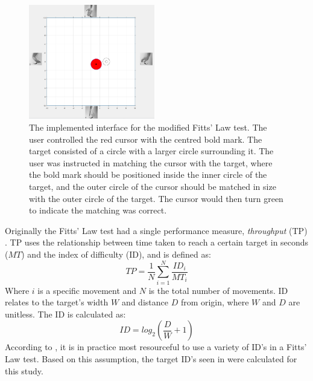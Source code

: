 \begin{figure}[H] 
	\includegraphics[width=0.49\textwidth]{figures/Paper/perftestGUI}
	\caption{The implemented interface for the modified Fitts' Law test. The user controlled the red cursor with the centred bold mark. The target consisted of a circle with a larger circle surrounding it. The user was instructed in matching the cursor with the target, where the bold mark should be positioned inside the inner circle of the target, and the outer circle of the cursor should be matched in size with the outer circle of the target. The cursor would then turn green to indicate the matching was correct.}
	\label{fig:fittsLawTask}
\end{figure}
\vspace{-0.2cm}
Originally the Fitts' Law test had a single performance measure, \textit{throughput} (TP) \cite{Fitts1954}. TP uses the relationship between time taken to reach a certain target in seconds ($MT$) and the index of difficulty (ID), and is defined as:
\begin{equation} \label{eq:TP}
TP=\frac{1}{N}\sum_{i=1}^{N} \frac{ID_i}{MT_i} 
\end{equation}
\noindent Where $i$ is a specific movement and $N$ is the total number of movements. ID relates to the target's width $W$ and distance $D$ from origin, where $W$ and $D$ are unitless. The ID is calculated as: 
\begin{equation} \label{eq:ID}
ID=log_2(\frac{D}{W}+1)
\end{equation}
\noindent According to \cite{Scheme2013a}, it is in practice most resourceful to use a variety of ID's in a Fitts' Law test. Based on this assumption, the target ID's seen in  were calculated for this study.
